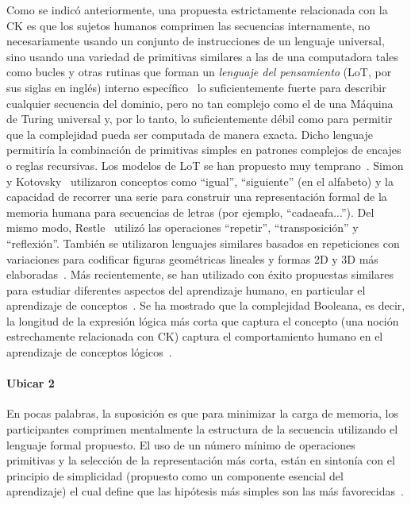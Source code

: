 Como se indicó anteriormente, una propuesta estrictamente relacionada con la CK es que los sujetos humanos comprimen las secuencias internamente, no necesariamente usando un conjunto de instrucciones de un lenguaje universal, sino usando una variedad de primitivas similares a las de una computadora tales como bucles y otras rutinas que forman un \textit{lenguaje del pensamiento} (LoT, por sus siglas en inglés)  interno específico~\cite{fodor1975language} lo suficientemente fuerte para describir cualquier secuencia del dominio, pero no tan complejo como el de una Máquina de Turing universal y, por lo tanto, lo suficientemente débil como para permitir que la complejidad pueda ser computada de manera exacta. Dicho lenguaje permitiría la combinación de primitivas simples en patrones complejos de encajes o reglas recursivas. Los modelos de LoT se han propuesto muy temprano~\cite{f33}. Simon y Kotovsky~\cite{f48} utilizaron conceptos como ``igual'', ``siguiente'' (en el alfabeto) y la capacidad de recorrer una serie para construir una representación formal de la memoria humana para secuencias de letras (por ejemplo, ``cadaeafa...''). Del mismo modo, Restle~\cite{f37} utilizó las operaciones ``repetir'', ``transposición'' y ``reflexión''. También se utilizaron lenguajes similares basados en repeticiones con variaciones para codificar figuras geométricas lineales y formas 2D y 3D más elaboradas~\cite{f33,leeuwenberg1971perceptual}. Más recientemente, se han utilizado con éxito propuestas similares para estudiar diferentes aspectos del aprendizaje humano, en particular el aprendizaje de conceptos~\cite{feldman2000minimization,f51, piantadosi2012bootstrapping,piantadosi2016four,f54}.  Se ha mostrado que la complejidad Booleana, es decir, la longitud de la expresión lógica más corta que captura el concepto (una noción estrechamente relacionada con CK) captura el comportamiento humano en el aprendizaje de conceptos lógicos~\cite{feldman2000minimization,feldman2003simplicity}.

\paragraph{Ubicar 2}

En pocas palabras, la suposición es que para minimizar la carga de memoria, los participantes comprimen mentalmente la estructura de la secuencia utilizando el lenguaje formal propuesto. El uso de un número mínimo de operaciones primitivas y la selección de la representación más corta, están en sintonía con el principio de simplicidad (propuesto como un componente esencial del aprendizaje) el cual define que las hipótesis más simples son las más favorecidas~\cite{f32,feldman2003simplicity}.

